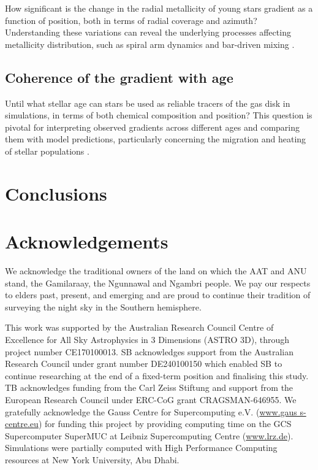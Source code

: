 \documentclass[fleqn,usenatbib]{mnras}
\begin{document}
How significant is the change in the radial metallicity of young stars gradient as a function of position, both in terms of radial coverage and azimuth? Understanding these variations can reveal the underlying processes affecting metallicity distribution, such as spiral arm dynamics and bar-driven mixing \citep[see their Figs. 5-8][]{DiMatteo2013}.

\subsection{Coherence of the gradient with age} \label{sec:discussion_coherence_age}

Until what stellar age can stars be used as reliable tracers of the gas disk in simulations, in terms of both chemical composition and position? This question is pivotal for interpreting observed gradients across different ages \citep[e.g.][]{Willett2023} and comparing them with model predictions, particularly concerning the migration and heating of stellar populations \citep{Binney2008, Frankel2018}.


\section{Conclusions}
\label{sec:conc}


\section*{Acknowledgements}

We acknowledge the traditional owners of the land on which the AAT and ANU stand, the Gamilaraay, the Ngunnawal and Ngambri people. We pay our respects to elders past, present, and emerging and are proud to continue their tradition of surveying the night sky in the Southern hemisphere.

This work was supported by the Australian Research Council Centre of Excellence for All Sky Astrophysics in 3 Dimensions (ASTRO 3D), through project number CE170100013. SB acknowledges support from the Australian Research Council under grant number DE240100150 which enabled SB to continue researching at the end of a fixed-term position and finalising this study. TB acknowledges funding from the Carl Zeiss Stiftung and support from the European Research Council under ERC-CoG grant CRAGSMAN-646955. We gratefully acknowledge the Gauss Centre for Supercomputing e.V. (\url{www.gaus s-centre.eu}) for funding this project by providing computing time on the GCS Supercomputer SuperMUC at Leibniz Supercomputing Centre (\url{www.lrz.de}). Simulations were partially computed with High Performance Computing resources at New York University, Abu Dhabi.
\end{document}
